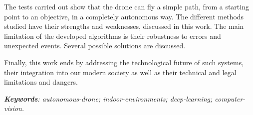The tests carried out show that the drone can fly a simple path, from a starting point to an objective, in a completely autonomous way. The different methods studied have their strengths and weaknesses, discussed in this work. The main limitation of the developed algorithms is their robustness to errors and unexpected events. Several possible solutions are discussed.

Finally, this work ends by addressing the technological future of such systems, their integration into our modern society as well as their technical and legal limitations and dangers.

\vspace{1.5em}

\noindent\textit{\textbf{Keywords}: autonomous-drone; indoor-environments; deep-learning; computer-vision.}

\restoregeometry
